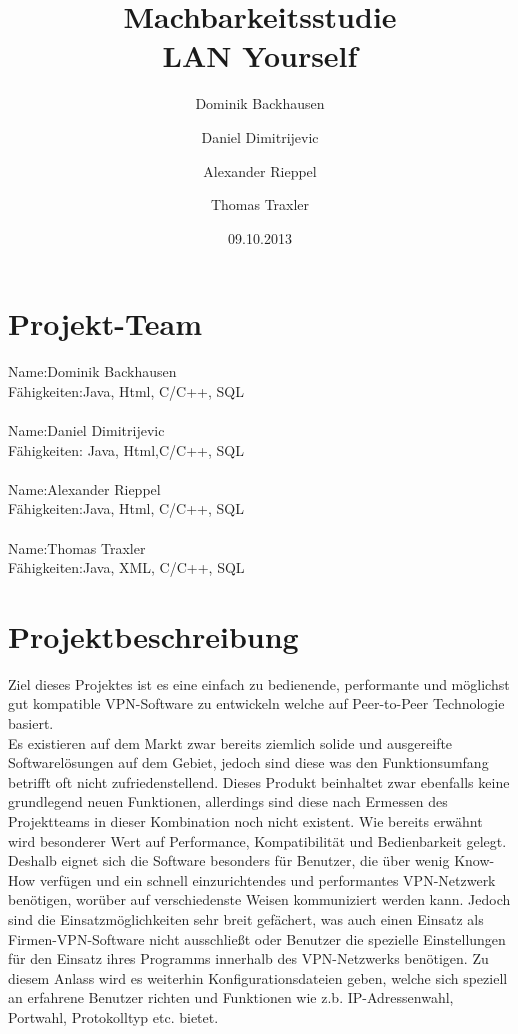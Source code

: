 \documentclass[a4paper,12pt]{scrreprt}
\begin{document}
\author{Dominik Backhausen\and Daniel Dimitrijevic\and Alexander Rieppel\and Thomas Traxler}
\title{Machbarkeitsstudie\\ LAN Yourself}
\date{09.10.2013}
\maketitle
\tableofcontents



\chapter{Projekt-Team}
	
	Name:Dominik Backhausen\\
	    Fähigkeiten:Java, Html, C/C++, SQL\\\\
	  	Name:Daniel Dimitrijevic
	\\ 	Fähigkeiten: Java, Html,C/C++, SQL    
	\\
	\\  Name:Alexander Rieppel
	\\
	    Fähigkeiten:Java, Html, C/C++, SQL
	    \\
	    \\
	    Name:Thomas Traxler
	    \\
	    Fähigkeiten:Java, XML, C/C++, SQL
	    \\
\chapter{Projektbeschreibung}
Ziel dieses Projektes ist es eine einfach zu bedienende, performante und möglichst gut kompatible VPN-Software zu entwickeln welche auf Peer-to-Peer Technologie basiert.\\

Es existieren auf dem Markt zwar bereits ziemlich solide und ausgereifte Softwarelösungen auf dem Gebiet, jedoch sind diese was den Funktionsumfang betrifft oft nicht zufriedenstellend. Dieses Produkt beinhaltet zwar ebenfalls keine grundlegend neuen Funktionen, allerdings sind diese nach Ermessen des Projektteams in dieser Kombination noch nicht existent. Wie bereits erwähnt wird besonderer Wert auf Performance, Kompatibilität und Bedienbarkeit gelegt. Deshalb eignet sich die Software besonders für Benutzer, die über wenig Know-How verfügen und ein schnell einzurichtendes und performantes VPN-Netzwerk benötigen, worüber auf verschiedenste Weisen kommuniziert werden kann. Jedoch sind die Einsatzmöglichkeiten sehr breit gefächert, was auch einen Einsatz als Firmen-VPN-Software nicht ausschließt oder Benutzer die spezielle Einstellungen für den Einsatz ihres Programms innerhalb des VPN-Netzwerks benötigen. Zu diesem Anlass wird es weiterhin Konfigurationsdateien geben, welche sich speziell an erfahrene Benutzer richten und Funktionen wie z.b. IP-Adressenwahl, Portwahl, Protokolltyp etc. bietet.\\
\end{document}
